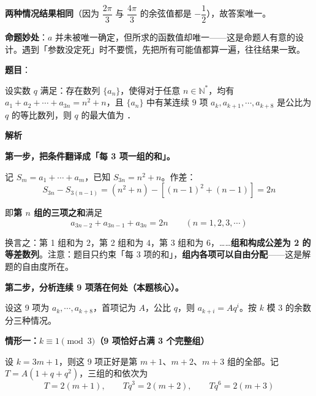\begin{answer}
\textbf{两种情况结果相同}（因为 $\dfrac{2\pi}{3}$ 与 $\dfrac{4\pi}{3}$ 的余弦值都是 $-\dfrac12$），故答案唯一。

\begin{gktip}
\textbf{命题妙处}：$a$ 并未被唯一确定，但所求的函数值却唯一——这是命题人有意的设计。遇到「参数没定死」时不要慌，先把所有可能值都算一遍，往往结果一致。
\end{gktip}


\par\medskip

\end{answer}
\begin{answer}

\textbf{题目}：

设实数 $q$ 满足：存在数列 $\{a_n\}$，使得对于任意 $n\in\mathbb{N}^*$，均有 $a_1+a_2+\cdots+a_{3n}=n^2+n$，且 $\{a_n\}$ 中有某连续 $9$ 项 $a_k,a_{k+1},\cdots,a_{k+8}$ 是公比为 $q$ 的等比数列，则 $q$ 的最大值为 \gkblank{}．

\textbf{解析}

\textbf{第一步，把条件翻译成「每 3 项一组的和」。}

记 $S_m=a_1+\cdots+a_m$，已知 $S_{3n}=n^2+n$。作差：
\nopagebreak[4]
\[S_{3n}-S_{3(n-1)}=\left(n^2+n\right)-\left[(n-1)^2+(n-1)\right]=2n\]

即\textbf{第 $n$ 组的三项之和}满足
\nopagebreak[4]
\[a_{3n-2}+a_{3n-1}+a_{3n}=2n\qquad(n=1,2,3,\cdots)\]

换言之：第 1 组和为 $2$，第 2 组和为 $4$，第 3 组和为 $6$，……\textbf{组和构成公差为 2 的等差数列}。注意：题目只约束「每 3 项的和」，\textbf{组内各项可以自由分配}——这是解题的自由度所在。

\textbf{第二步，分析连续 9 项落在何处（本题核心）。}

设这 9 项为 $a_k,\cdots,a_{k+8}$，首项记为 $A$，公比 $q$，则 $a_{k+i}=Aq^{i}$。按 $k$ 模 $3$ 的余数分三种情况。

\par\medskip

\textbf{情形一：$k\equiv1\pmod 3$（9 项恰好占满 3 个完整组）}

设 $k=3m+1$，则这 9 项正好是第 $m+1$、$m+2$、$m+3$ 组的全部。记 $T=A\left(1+q+q^2\right)$，三组的和依次为
\nopagebreak[4]
\[T=2(m+1),\qquad Tq^3=2(m+2),\qquad Tq^{6}=2(m+3)\]


\end{answer}
